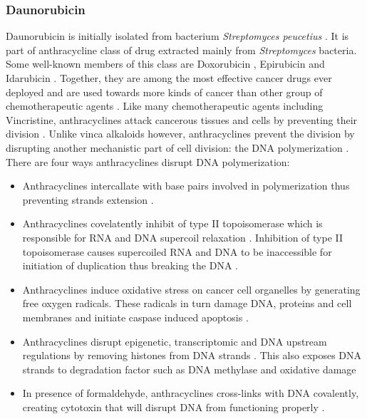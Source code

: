 \documentclass[pdftex,12pt,a4paper]{report}
\begin{document}
\subsubsection*{Daunorubicin}

Daunorubicin is initially isolated from bacterium \textit{Streptomyces peucetius} \cite{otten1990cloning, lin2011chiral}. It is part of anthracycline class of drug \cite{gewirtz1999critical} extracted mainly from \textit{Streptomyces} bacteria. Some well-known members of this class are Doxorubicin \cite{nci2018defdoxorubicin}, Epirubicin \cite{nci2018defepirubicin} and Idarubicin \cite{nci2018defidarubicin}. Together, they are among the most effective cancer drugs ever deployed and are used towards more kinds of cancer than other group of chemotherapeutic agents \cite{weiss1992anthracyclines, minotti2004anthracyclines, peng2005cardiotoxicology}. Like many chemotherapeutic agents including Vincristine, anthracyclines attack cancerous tissues and cells by preventing their division \cite{drugs2018defdaunorubicin}. Unlike vinca alkaloids however, anthracyclines prevent the division by disrupting another mechanistic part of cell division: the DNA polymerization \cite{gewirtz1999critical}. There are four ways anthracyclines disrupt DNA polymerization:

\begin{itemize}
\item Anthracyclines intercallate with base pairs involved in polymerization thus preventing strands extension \cite{takimoto2008principles}.

\item Anthracyclines covelatently inhibit of type II topoisomerase which is responsible for RNA and DNA supercoil relaxation \cite{wang2002cellular}. Inhibition of type II topoisomerase causes supercoiled RNA and DNA to be inaccessible for initiation of duplication thus breaking the DNA \cite{tewey1984adriamycin}.

\item Anthracyclines induce oxidative stress on cancer cell organelles by generating free oxygen radicals. These radicals in turn damage DNA, proteins and cell membranes and initiate caspase induced apoptosis \cite{vsimuunek2009anthracycline, halliwell1994free}.

\item Anthracyclines disrupt epigenetic, transcriptomic and DNA upstream regulations by removing histones from DNA strands \cite{pang2013drug}. This also exposes DNA strands to degradation factor such as DNA methylase \cite{vaissiere2008epigenetic} and oxidative damage \cite{ljungman1992efficient}

\item In presence of formaldehyde, anthracyclines cross-links with DNA covalently, creating cytotoxin that will disrupt DNA from functioning properly \cite{wang1991formaldehyde}.
\end{itemize}
\end{document}
